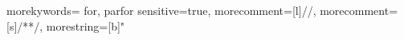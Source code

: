 {
	morekywords={
		for,
		parfor
	}
	sensitive=true, %
	morecomment=[l]{//}, %
	morecomment=[s]{/*}{*/}, %
	morestring=[b]" %
}

